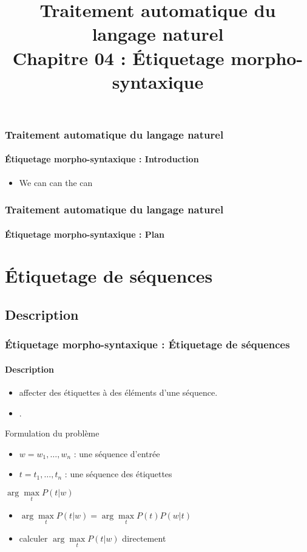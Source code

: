 \documentclass[xcolor=table]{beamer}
\title[TALN : 04- Étiquetage morpho-syntaxique]%
{Traitement automatique du langage naturel\\Chapitre 04 : Étiquetage morpho-syntaxique}
\begin{document}
	
\begin{frame}
\frametitle{Traitement automatique du langage naturel}
\framesubtitle{Étiquetage morpho-syntaxique : Introduction}

\begin{itemize}
	\item We can can the can
	
\end{itemize}

\end{frame}


\begin{frame}
\frametitle{Traitement automatique du langage naturel}
\framesubtitle{Étiquetage morpho-syntaxique : Plan}

\begin{multicols}{2}
\tableofcontents
\end{multicols}
\end{frame}

\section{Étiquetage de séquences}

\subsection{Description}

\begin{frame}
\frametitle{Étiquetage morpho-syntaxique : Étiquetage de séquences}
\framesubtitle{Description}


\begin{itemize}
	\item {} affecter des étiquettes à des éléments d'une séquence. 
	\item {} .
\end{itemize}

\begin{block}{Formulation du problème}
	\begin{itemize}
		\item $w = w_1, \ldots, w_n$ : une séquence d'entrée
		\item $t = t_1, \ldots, t_n$ : une séquence des étiquettes
	\end{itemize}
	\begin{center}
		$ \arg\max\limits_t P(t | w)$
	\end{center}
	
	\begin{itemize}
		\item {} $ \arg\max\limits_t P(t | w) = \arg\max\limits_t P(t) P(w | t) $
		\item {} calculer $\arg\max\limits_t P(t | w)$ directement
	\end{itemize}
\end{block}

\end{frame}
\end{document}
